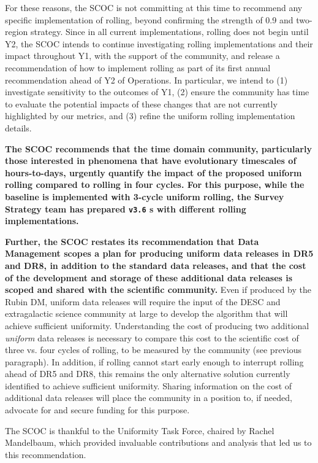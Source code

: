 For these reasons, the SCOC is not committing at this time to recommend any specific implementation of rolling, beyond confirming the strength of 0.9 and two-region strategy. Since in all current implementations,
rolling does not begin until Y2, the SCOC intends to continue investigating rolling implementations and their impact throughout Y1, with the support of the community, and release a recommendation of how to implement rolling as part of its first annual recommendation ahead of Y2 of Operations. In particular, we intend to (1) investigate sensitivity to the outcomes of Y1, (2) ensure the community has time to evaluate the potential impacts of these changes that are not currently highlighted by our metrics, and (3) refine the uniform rolling implementation details.

{\bf The SCOC recommends that the time domain community, particularly those interested in phenomena that have evolutionary timescales of hours-to-days, urgently quantify the impact of the proposed uniform rolling compared to rolling in four cycles. For this purpose, while the baseline is implemented with 3-cycle uniform rolling, the Survey Strategy team has prepared \texttt{v3.6} \opsim s  with different rolling implementations.}

{\bf Further, the SCOC restates its recommendation that Data Management scopes a plan for producing uniform data releases in DR5 and DR8, in addition to the standard data releases, and that the cost of the development and storage of these additional data releases is scoped and shared with the scientific community.} Even if produced by the Rubin DM, uniform data releases will require the input of the DESC and extragalactic science community at large to develop the algorithm that will achieve sufficient uniformity. Understanding the cost of producing two additional {\it uniform} data releases is necessary to compare this cost to the scientific cost of three vs. four cycles of rolling, to be measured by the community (see previous paragraph). In addition, if rolling cannot start early enough to interrupt rolling ahead of DR5 and DR8, this remains the only alternative solution currently identified to achieve sufficient uniformity. Sharing information on the cost of additional data releases will place the community in a position to, if needed, advocate for and secure funding for this purpose.

The SCOC is thankful to the Uniformity Task Force, chaired by Rachel Mandelbaum, which provided invaluable contributions and analysis that led us to this recommendation.

